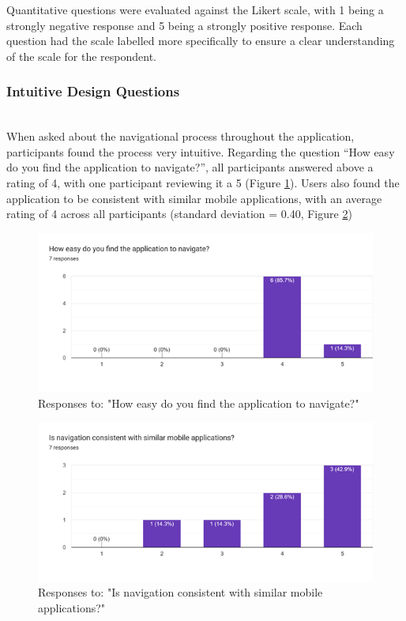 \documentclass{l4proj}
\begin{document}
Quantitative questions were evaluated against the Likert scale, with 1 being a strongly negative response and 5 being a strongly positive response. Each question had the scale labelled more specifically to ensure a clear understanding of the scale for the respondent.

\subsubsection{Intuitive Design Questions}
\noindent\mbox{}\\

When asked about the navigational process throughout the application, participants found the process very intuitive. Regarding the question “How easy do you find the application to navigate?”, all participants answered above a rating of 4, with one participant reviewing it a 5 (Figure \ref{fig:navigateeasy}). Users also found the application to be consistent with similar mobile applications, with an average rating of 4 across all participants (standard deviation = 0.40, Figure \ref{fig:navconsistent})

\begin{figure}[h!]
    \centering
    \includegraphics[width=0.61\linewidth]{dissertation//dissImages/NavigationEasy.png}
    \caption{Responses to: "How easy do you find the application to navigate?"}
    \label{fig:navigateeasy}
\end{figure}

\begin{figure}[h!]
    \centering
    \includegraphics[width=0.61\linewidth]{dissertation//dissImages/NavigationConsistency.png}
    \caption{Responses to: "Is navigation consistent with similar mobile applications?"}
    \label{fig:navconsistent}
\end{figure}
\end{document}
